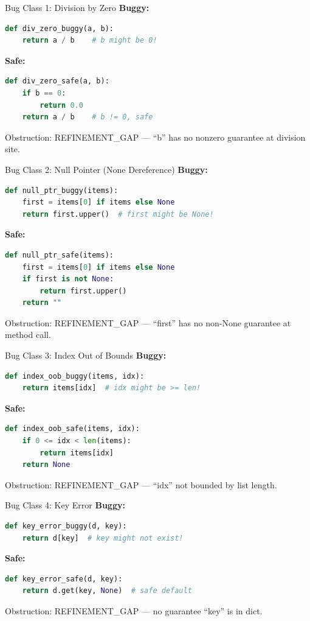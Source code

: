 \documentclass[aspectratio=169,10pt]{beamer}
\newcommand{\warn}[1]{\begin{center}
  \colorbox{warnbg}{\parbox{0.88\textwidth}{\centering\small #1}}\end{center}}
\begin{document}
\begin{frame}[fragile]{Bug Class 1: Division by Zero}
\textbf{Buggy:}
\begin{lstlisting}[language=Python, basicstyle=\ttfamily\scriptsize]
def div_zero_buggy(a, b):
    return a / b    # b might be 0!
\end{lstlisting}
\textbf{Safe:}
\begin{lstlisting}[language=Python, basicstyle=\ttfamily\scriptsize]
def div_zero_safe(a, b):
    if b == 0:
        return 0.0
    return a / b    # b != 0, safe
\end{lstlisting}
\warn{Obstruction: REFINEMENT\_GAP --- ``b'' has no nonzero guarantee at division site.}
\end{frame}

\begin{frame}[fragile]{Bug Class 2: Null Pointer (None Dereference)}
\textbf{Buggy:}
\begin{lstlisting}[language=Python, basicstyle=\ttfamily\scriptsize]
def null_ptr_buggy(items):
    first = items[0] if items else None
    return first.upper()  # first might be None!
\end{lstlisting}
\textbf{Safe:}
\begin{lstlisting}[language=Python, basicstyle=\ttfamily\scriptsize]
def null_ptr_safe(items):
    first = items[0] if items else None
    if first is not None:
        return first.upper()
    return ""
\end{lstlisting}
\warn{Obstruction: REFINEMENT\_GAP --- ``first'' has no non-None guarantee at method call.}
\end{frame}

\begin{frame}[fragile]{Bug Class 3: Index Out of Bounds}
\textbf{Buggy:}
\begin{lstlisting}[language=Python, basicstyle=\ttfamily\scriptsize]
def index_oob_buggy(items, idx):
    return items[idx]  # idx might be >= len!
\end{lstlisting}
\textbf{Safe:}
\begin{lstlisting}[language=Python, basicstyle=\ttfamily\scriptsize]
def index_oob_safe(items, idx):
    if 0 <= idx < len(items):
        return items[idx]
    return None
\end{lstlisting}
\warn{Obstruction: REFINEMENT\_GAP --- ``idx'' not bounded by list length.}
\end{frame}

\begin{frame}[fragile]{Bug Class 4: Key Error}
\textbf{Buggy:}
\begin{lstlisting}[language=Python, basicstyle=\ttfamily\scriptsize]
def key_error_buggy(d, key):
    return d[key]  # key might not exist!
\end{lstlisting}
\textbf{Safe:}
\begin{lstlisting}[language=Python, basicstyle=\ttfamily\scriptsize]
def key_error_safe(d, key):
    return d.get(key, None)  # safe default
\end{lstlisting}
\warn{Obstruction: REFINEMENT\_GAP --- no guarantee ``key'' is in dict.}
\end{frame}
\end{document}
